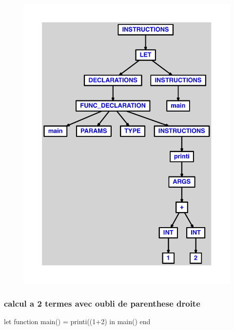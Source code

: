 \documentclass{article}
\begin{document}
\begin{figure}[H]\centering\includegraphics[max width=\textwidth]{ast/ast_27.pdf}\end{figure}\subsubsection{calcul a 2 termes avec oubli de parenthese droite}
\begin{verbatimtab}
let function main() = printi((1+2) in main() end
\end{verbatimtab}
\end{document}
